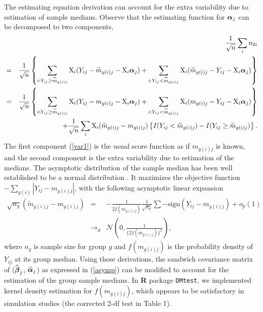 \documentclass{statsoc}
\begin{document}
The estimating equation derivation can account for the extra variability due to estimation of sample medians. Observe that the estimating function for $\mbox{\boldmath $ \alpha $}_{j}$ can be decomposed to two components,
\begin{eqnarray}
 & & \frac{1}{\sqrt{n}}\sum_i u_{2i} \nonumber \\
 &=& \frac{1}{\sqrt{n}} \left\{ \sum_{i: Y_{ij}\geq \widetilde{m}_{g(i)j}} \mbox{X}_{i} (Y_{ij}- \widetilde{m}_{g(i)j} - \mbox{X}_{i}\mbox{\boldmath $ \alpha $}_{j} ) + \sum_{i: Y_{ij}< \widetilde{m}_{g(i)j}} \mbox{X}_{i} (\widetilde{m}_{g(i)j} - Y_{ij} - \mbox{X}_{i}\mbox{\boldmath $ \alpha $}_{j} ) \right\} \nonumber \\
&=& \frac{1}{\sqrt{n}} \left\{ \sum_{i: Y_{ij}\geq \widetilde{m}_{g(i)j}} \mbox{X}_{i} (Y_{ij}- m_{g(i)j} - \mbox{X}_{i}\mbox{\boldmath $ \alpha $}_{j} ) + \sum_{i: Y_{ij}< \widetilde{m}_{g(i)j}} \mbox{X}_{i} ( m_{g(i)j} - Y_{ij} - \mbox{X}_{i}\mbox{\boldmath $ \alpha $}_{j} ) \right\} \label{var1} \\
  & & + \frac{1}{\sqrt{n}} \sum_i \mbox{X}_{i} (\widetilde{m}_{g(i)j} - m_{g(i)j}) \left\{ I(Y_{ij} < \widetilde{m}_{g(i)j}) - I(Y_{ij} \geq \widetilde{m}_{g(i)j}) \right\}. \label{var2}
\end{eqnarray}
The first component (\ref{var1}) is the usual score function as if $m_{g(i)j}$ is known, and the second component is the extra variability due to estimation of the medians. The asymptotic distribution of the sample median has been well established to be a normal distribution \citep{VanderVaart2005}. It maximizes the objective function $- \sum_{g(i)} |Y_{ij} - m_{g(i)j}|$, with the following asymptotic linear expansion
\begin{eqnarray}
\sqrt{n_g} (\widetilde{m}_{g(i)j} - m_{g(i)j}) &=&  -\frac{1}{2f(m_{g(i)j})} \frac{1}{\sqrt{n_g}} \sum  -\mbox{sign}(Y_{ij} - m_{g(i)j})  + o_p(1) \nonumber \\
&\rightarrow_d& \mathcal{N}\left(0, \frac{1}{\{2f(m_{g(i)j})\}^2}\right), \nonumber
\end{eqnarray}
where $n_g$ is sample size for group $g$ and $f(m_{g(i)j})$ is the probability density of $Y_{ij}$ at its group median. Using these derivations, the sandwich covariance matrix of ($\widehat{\mbox{\boldmath $ \beta $}}_{j}$, $\widehat{\mbox{\boldmath $ \alpha $}}_{j}$) as expressed in (\ref{asymp}) can be modified to account for the estimation of the group sample medians. In {\bf R} package \texttt{DMtest}, we implemented kernel density estimation for $f(m_{g(i)j})$, which appears to be satisfactory in simulation studies (the corrected 2-df test in Table 1).
\end{document}
